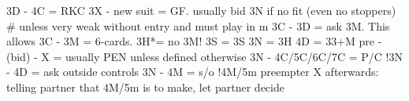 3D - 4C = RKC
3X - new suit = GF. usually bid 3N if no fit (even no stoppers)  # unless very weak without entry and must play in m
3C - 3D = ask 3M. This allows 3C - 3M = 6-cards.
    3H*= no 3M!
    3S = 3S
    3N = 3H
    4D = 33+M
pre - (bid) - X = usually PEN unless defined otherwise
3N - 4C/5C/6C/7C = P/C
!3N - 4D = ask outside controls
3N - 4M = s/o
!4M/5m preempter X afterwards: telling partner that 4M/5m is to make, let partner decide